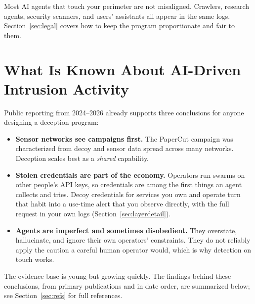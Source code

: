 \documentclass[11pt,letterpaper]{article}
\begin{document}
Most AI agents that touch your perimeter are not misaligned. Crawlers, research agents, security scanners, and users' assistants all appear in the same logs. Section~\ref{sec:legal} covers how to keep the program proportionate and fair to them.

\section{What Is Known About AI-Driven Intrusion Activity}
\label{sec:evidence}

Public reporting from 2024--2026 already supports three conclusions for anyone designing a deception program:

\begin{keybox}
\begin{itemize}
  \item \textbf{Sensor networks see campaigns first.} The PaperCut campaign was characterized from decoy and sensor data spread across many networks. Deception scales best as a \emph{shared} capability.
  \item \textbf{Stolen credentials are part of the economy.} Operators run swarms on other people's API keys, so credentials are among the first things an agent collects and tries. Decoy credentials for services you own and operate turn that habit into a use-time alert that you observe directly, with the full request in your own logs (Section~\ref{sec:layerdetail}).
  \item \textbf{Agents are imperfect and sometimes disobedient.} They overstate, hallucinate, and ignore their own operators' constraints. They do not reliably apply the caution a careful human operator would, which is why detection on touch works.
\end{itemize}
\end{keybox}

The evidence base is young but growing quickly. The findings behind these conclusions, from primary publications and in date order, are summarized below; see Section~\ref{sec:refs} for full references.
\end{document}
